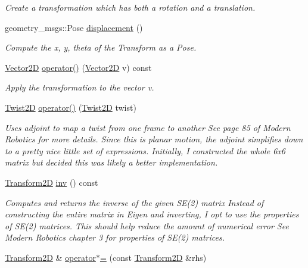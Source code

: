 \begin{DoxyCompactItemize}
\begin{DoxyCompactList}\small\item\em Create a transformation which has both a rotation and a translation. \end{DoxyCompactList}\item 
geometry\+\_\+msgs\+::\+Pose \hyperlink{classrigid2d_1_1Transform2D_aedcb4e4472f57e774ddf21b441c7967f}{displacement} ()
\begin{DoxyCompactList}\small\item\em Compute the x, y, theta of the Transform as a Pose. \end{DoxyCompactList}\item 
\hyperlink{structrigid2d_1_1Vector2D}{Vector2D} \hyperlink{classrigid2d_1_1Transform2D_aab68d8df21419767d4291e226e0a3481}{operator()} (\hyperlink{structrigid2d_1_1Vector2D}{Vector2D} v) const
\begin{DoxyCompactList}\small\item\em Apply the transformation to the vector v. \end{DoxyCompactList}\item 
\hyperlink{classrigid2d_1_1Twist2D}{Twist2D} \hyperlink{classrigid2d_1_1Transform2D_a64346bd397406cf26e12d3022a3c3dee}{operator()} (\hyperlink{classrigid2d_1_1Twist2D}{Twist2D} twist)
\begin{DoxyCompactList}\small\item\em Uses adjoint to map a twist from one frame to another See page 85 of Modern Robotics for more details. Since this is planar motion, the adjoint simplifies down to a pretty nice little set of expressions. Initially, I constructed the whole 6x6 matrix but decided this was likely a better implementation. \end{DoxyCompactList}\item 
\hyperlink{classrigid2d_1_1Transform2D}{Transform2D} \hyperlink{classrigid2d_1_1Transform2D_a921bb5138fd83e48aaf75349dfd51653}{inv} () const
\begin{DoxyCompactList}\small\item\em Computes and returns the inverse of the given S\+E(2) matrix Instead of constructing the entire matrix in Eigen and inverting, I opt to use the properties of S\+E(2) matrices. This should help reduce the amount of numerical error See Modern Robotics chapter 3 for properties of S\+E(2) matrices. \end{DoxyCompactList}\item 
\hyperlink{classrigid2d_1_1Transform2D}{Transform2D} \& \hyperlink{classrigid2d_1_1Transform2D_ae832dd7b1488f6440ba2f98e95b684b5}{operator$\ast$=} (const \hyperlink{classrigid2d_1_1Transform2D}{Transform2D} \&rhs)

\end{DoxyCompactItemize}
